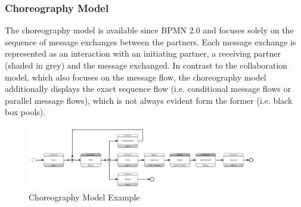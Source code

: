 \subsubsection{Choreography Model}
The choreography model is available since BPMN 2.0 and focuses solely on the sequence of message exchanges between the partners. Each message exchange is represented as an interaction with an initiating 
partner, a receiving partner (shaded in grey) and the message exchanged. In contrast to the collaboration model, which also focuses on the message flow, the choreography model additionally displays the exact sequence flow (i.e. conditional message flows or parallel message flows), which is not always evident form the former (i.e. black box pools).

\begin{figure}[H]
\centering
\includegraphics[width=0.9\textwidth]{src/images/choreo_advertisement.png}
\caption{Choreography Model Example}
\label{fig:choreoModel}
\end{figure}